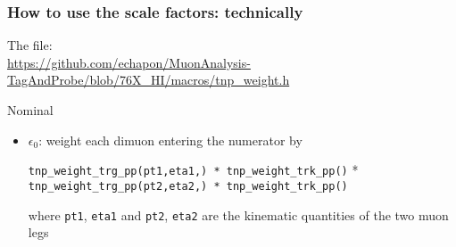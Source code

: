 \documentclass[10pt]{beamer}
\begin{document}
 \begin{frame}
  \frametitle{How to use the scale factors: technically}
  
  The file: \\\url{https://github.com/echapon/MuonAnalysis-TagAndProbe/blob/76X_HI/macros/tnp_weight.h}
  
  \begin{block}{Nominal}
  \begin{itemize}
   \item \alert{$\epsilon_0$}: weight each dimuon entering the numerator by
   
   \vspace{10pt}
   
   \texttt{tnp\_weight\_trg\_pp(pt1,eta1,) * tnp\_weight\_trk\_pp()} *\\
   \texttt{tnp\_weight\_trg\_pp(pt2,eta2,) * tnp\_weight\_trk\_pp()}\\
   
   \vspace{10pt}
   
   where \texttt{pt1}, \texttt{eta1} and \texttt{pt2}, \texttt{eta2} are the kinematic quantities of the two muon legs
   \end{itemize}
  \end{block}

 \end{frame}
\end{document}
